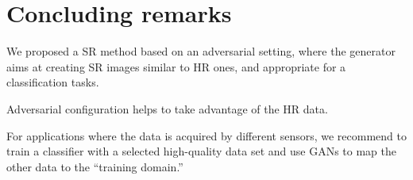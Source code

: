 \documentclass[10pt,twocolumn,letterpaper]{article}
\begin{document}
\section{Concluding remarks}
\label{sec:conclusion}

We proposed a SR method based on an adversarial setting, where the generator aims at creating SR images similar to HR ones, and appropriate for a classification tasks.

Adversarial configuration helps to take advantage of the HR data.

For applications where the data is acquired by different sensors, we recommend to train a classifier with a selected high-quality data set and use GANs to map the other data to the ``training domain.''


{\small


}
\end{document}
